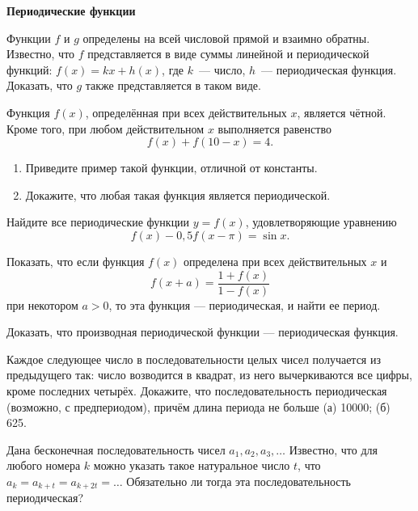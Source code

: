 \documentclass{article}
\begin{document}
    \large

    \begin{center}
        \textbf{Периодические функции}
    \end{center}

    \begin{enumerate_boxed}

        \item Функции $f$ и $g$ определены на всей числовой прямой и взаимно обратны.
        Известно, что $f$ представляется в виде суммы линейной и периодической функций: $f(x) = kx + h(x)$,  где $k$~--- число, $h$~--- периодическая функция.
        Доказать, что $g$ также представляется в таком виде.

        \item Функция $f(x)$, определённая при всех действительных
        $x$, является чётной.
        Кроме того, при любом действительном $x$ выполняется равенство
        \[f(x) + f(10 - x) = 4.\]
        \begin{enumerate}
            \item Приведите пример такой функции, отличной от константы.
            \item Докажите, что любая такая функция является периодической.
        \end{enumerate}

        \item Найдите все периодические функции $y = f(x)$, удовлетворяющие уравнению
        \[f(x) - 0,5f(x - \pi) = \sin x.\]

        \item Показать, что если функция $f(x)$ определена при всех действительных $x$ и \[f(x + a) = \frac{1 + f(x)}{1 - f(x)}\] при некотором $a > 0$, то эта функция — периодическая, и найти ее период.

        \item Доказать, что производная периодической функции — периодическая функция.

        \item Каждое следующее число в последовательности целых чисел получается из предыдущего так: число возводится в квадрат, из него вычеркиваются все цифры, кроме последних
        четырёх.
        Докажите, что последовательность периодическая (возможно, с предпериодом),
        причём длина периода не больше (а) 10000; (б) 625.

        \item Дана бесконечная последовательность чисел $a_1, a_2, a_3, \dotsc$
        Известно, что для любого номера $k$ можно указать такое натуральное число $t$, что $a_k = a_{k+t} = a_{k+2t} = \dotsc$
        Обязательно ли тогда эта последовательность периодическая?


\end{enumerate_boxed}
\end{document}
